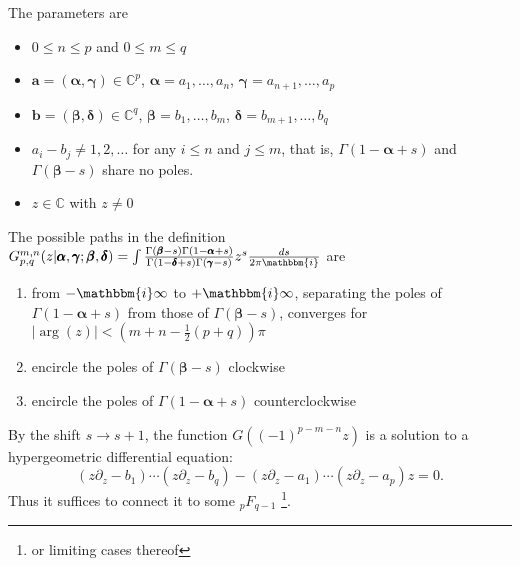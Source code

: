 \documentclass[12pt]{article}
\newcommand{\ii}[0] {\mathbbm{i}}
\numberwithin{equation}{section}
\newcommand{\bfa}[0] {\mathbf{a}}
\newcommand{\bfb}[0] {\mathbf{b}}
\newcommand{\bfalpha}[0] {\pmb{\alpha}}
\newcommand{\bfgamma}[0] {\pmb{\gamma}}
\newcommand{\bfbeta}[0]  {\pmb{\beta}}
\newcommand{\bfdelta}[0] {\pmb{\delta}}
\begin{document}
The parameters are
\begin{itemize}
\item{$0 \le n \le p$ and $0 \le m \le q$}
\item{$\bfa = (\bfalpha, \bfgamma) \in \mathbb{C}^{p}$, $\bfalpha = a_1, \dots, a_n$, $\bfgamma = a_{n+1}, \dots, a_p$}
\item{$\bfb = (\bfbeta, \bfdelta) \in \mathbb{C}^{q}$, $\bfbeta = b_1, \dots, b_m$, $\bfdelta = b_{m+1}, \dots, b_q$}
\item{$a_i-b_j \neq 1, 2, \dots$ for any $i \le n$ and $j \le m$, that is, $\Gamma(1-\bfalpha+s)$ and $\Gamma(\bfbeta-s)$ share no poles.}
\item{$z \in \mathbb{C}$ with $z \neq 0$}
\end{itemize}
The possible paths in the definition $ G_{p,q}^{m,n} (z |\bfalpha, \bfgamma; \bfbeta, \bfdelta) = \int \frac{\Gamma(\bfbeta-s)\Gamma(1-\bfalpha+s)}{\Gamma(1-\bfdelta+s)\Gamma(\bfgamma-s)}z^s\frac{ds}{2 \pi \ii}$ are
\begin{enumerate}
\item{from $-\ii \infty$ to $+ \ii \infty$, separating the poles of $\Gamma(1-\bfalpha+s)$ from those of $\Gamma(\bfbeta-s)$, converges for $|\arg(z)| < (m+n-\tfrac{1}{2}(p+q)) \pi$}
\item{encircle the poles of $\Gamma(\bfbeta-s)$ clockwise}
\item{encircle the poles of $\Gamma(1-\bfalpha+s)$ counterclockwise}
\end{enumerate}
By the shift $s \to s+1$, the function $G((-1)^{p-m-n}z)$ is a solution to a hypergeometric differential equation:
\begin{equation*}
(z \partial_z - b_1)\cdots (z \partial_z - b_q)-(z \partial_z - a_1) \cdots (z \partial_z - a_p) z = 0\text{.}
\end{equation*}
Thus it suffices to connect it to some ${}_p F_{q-1}$ \footnote{or limiting cases thereof}.
\end{document}
